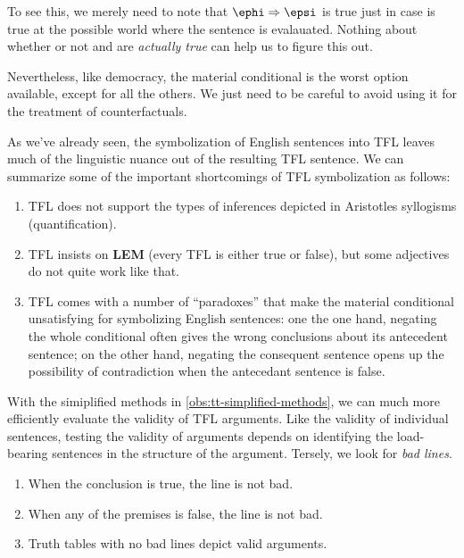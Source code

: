 To see this, we merely need to note that $\ephi\Rightarrow\epsi$ is true just
in case \epsi is true at the possible world where the sentence is evalauated.
Nothing about whether or not \ephi and \epsi are \emph{actually true} can help
us to figure this out.

Nevertheless, like democracy, the material conditional is the worst option
available, except for all the others. We just need to be careful to avoid
using it for the treatment of counterfactuals.

As we've already seen, the symbolization of English sentences into TFL leaves
much of the linguistic nuance out of the resulting TFL sentence. We can
summarize some of the important shortcomings of TFL symbolization as follows:

\begin{observation}
  \label{obs:tfl-shortcomings}
  \begin{enumerate}
  \item TFL does not support the types of inferences depicted in Aristotles
    syllogisms (quantification).
  \item TFL insists on \textbf{LEM} (every TFL is either true
    or false), but some adjectives do not quite work like that.
  \item TFL comes with a number of ``paradoxes'' that make the material
    conditional unsatisfying for symbolizing English sentences: one the one
    hand, negating the whole conditional often gives the wrong conclusions
    about its antecedent sentence; on the other hand, negating the consequent
    sentence opens up the possibility of contradiction when the antecedant
    sentence is false.
  \end{enumerate}
\end{observation}

With the simiplified methods in \ref{obs:tt-simplified-methods}, we can much
more efficiently evaluate the validity of TFL arguments. Like the validity of
individual sentences, testing the validity of arguments depends on identifying
the load-bearing sentences in the structure of the argument. Tersely, we look
for \emph{bad lines}.

\begin{observation}
  \label{obs:tt-bad-lines}
  \begin{enumerate}
  \item When the conclusion is true, the line is not bad.
  \item When any of the premises is false, the line is not bad.
  \item Truth tables with no bad lines depict valid arguments.
  \end{enumerate}
\end{observation}

